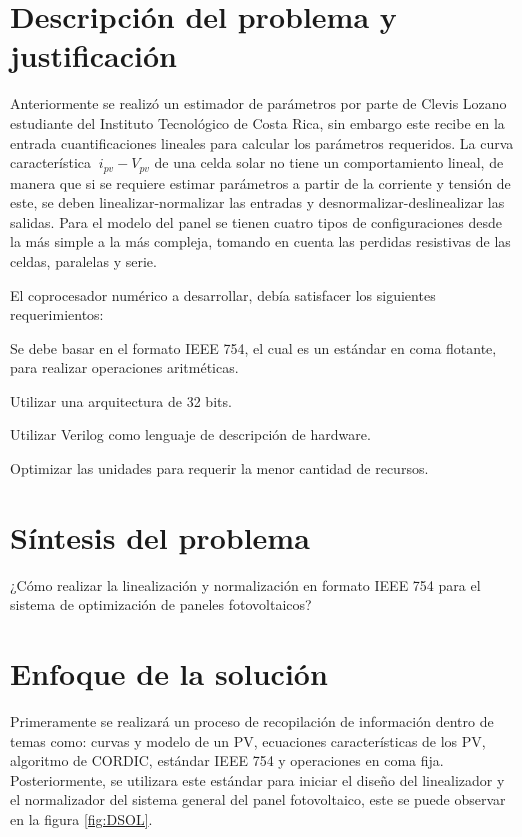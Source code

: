 \section{Descripción del problema y justificación}

Anteriormente se realizó un estimador de parámetros por parte de Clevis Lozano estudiante del Instituto Tecnológico de Costa Rica, sin embargo este recibe en la entrada cuantificaciones lineales para calcular los parámetros requeridos. La curva característica $\ i_{pv}-V_{pv}$ de una celda solar no tiene un comportamiento lineal, de manera que si se requiere estimar parámetros a partir de la corriente y tensión de este, se deben linealizar-normalizar las entradas y desnormalizar-deslinealizar las salidas. 
Para el modelo del panel se tienen cuatro tipos de configuraciones desde la más simple a la más compleja, tomando en cuenta las perdidas resistivas de las celdas, paralelas y serie.  

El coprocesador numérico a desarrollar, debía satisfacer los siguientes requerimientos:

\begin{compactitem}
\item Se debe basar en el formato IEEE 754, el cual es un estándar en coma flotante, para realizar operaciones aritméticas.
\item Utilizar una arquitectura de 32 bits.
\item Utilizar Verilog como lenguaje de descripción de hardware.
\item Optimizar las unidades para requerir la menor cantidad de recursos.
\end{compactitem}

\section{Síntesis del problema}

¿Cómo realizar la linealización y normalización en formato IEEE 754 para el sistema de optimización de paneles fotovoltaicos?

\section{Enfoque de la solución}

Primeramente se realizará un proceso de recopilación de información dentro de temas como: curvas y modelo de un PV, ecuaciones características de los PV, algoritmo de CORDIC, estándar IEEE 754 y operaciones en coma fija. Posteriormente, se utilizara este estándar para iniciar el diseño del linealizador y el normalizador del sistema general del panel fotovoltaico, este se puede observar en la figura \ref{fig:DSOL}. 

